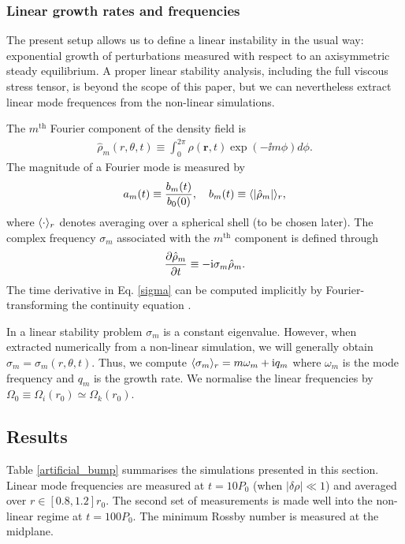 \subsubsection{Linear growth rates and frequencies}
The present setup allows us to define a linear instability in the
usual way: exponential growth of perturbations measured with respect
to an axisymmetric steady equilibrium. A proper linear
stability analysis, including the full viscous stress tensor, is
beyond the scope of this paper, but we can nevertheless extract linear 
mode frequences from the non-linear simulations.  

The $m^\mathrm{th}$ Fourier component of the density field is  
\begin{align}
\hat{\rho}_m(r,\theta,t) \equiv \int_0^{2\pi} \rho(\bm{r},t)\exp{(-\ii
  m\phi)}d\phi. 
\end{align} 
The magnitude of a Fourier mode is measured by 
\begin{align} 
a_m(t)\equiv \frac{b_m(t)}{b_0(0)},\quad b_m(t)\equiv \langle |\hat{\rho}_m| \rangle_r,
\end{align} 
where $\langle \cdot \rangle_r$ denotes averaging over a spherical shell (to be
chosen later). 
The complex frequency $\sigma_m$ associated with the $m^\mathrm{th}$ component 
is defined through 
\begin{align}\label{sigma}
  \frac{\partial\hat{\rho}_m}{\partial t} \equiv -\mathrm{i}\sigma_m\hat{\rho}_m. 
\end{align}
The time derivative in Eq. \ref{sigma} can be computed implicitly by 
Fourier-transforming the continuity equation \citep[as done
  in][]{lin13}. 

In a linear stability problem $\sigma_m$ is a constant eigenvalue. 
However, when extracted numerically from a non-linear simulation, 
we will generally obtain $\sigma_m=\sigma_m(r,\theta,t)$. Thus, we compute 
$\langle \sigma_m \rangle_r = m\omega_m + \mathrm{i} q_m$    
where $\omega_m$ is the mode frequency and $q_m$ is the growth rate.
We normalise the linear frequencies by
$\Omega_0\equiv\Omega_i(r_0)\simeq\Omega_k(r_0)$. 

\subsection{Results}
Table \ref{artificial_bump} summarises the simulations presented in
this section. Linear mode frequencies are measured at 
$t=10P_0$ (when $|\delta\rho|\ll 1$) and averaged over 
$r\in[0.8,1.2]r_0$. The second set of measurements is made well into
the non-linear regime at $t=100P_0$. 
The minimum Rossby number is measured at
the midplane.  

